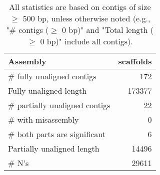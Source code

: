 \documentclass[12pt,a4paper]{article}
\begin{document}
\begin{table}[ht]
\begin{center}
\caption{All statistics are based on contigs of size $\geq$ 500 bp, unless otherwise noted (e.g., "\# contigs ($\geq$ 0 bp)" and "Total length ($\geq$ 0 bp)" include all contigs).}
\begin{tabular}{|l*{1}{|r}|}
\hline
Assembly & scaffolds \\ \hline
\# fully unaligned contigs & 172 \\ \hline
Fully unaligned length & 173377 \\ \hline
\# partially unaligned contigs & 22 \\ \hline
\hspace{5mm}\# with misassembly & 0 \\ \hline
\hspace{5mm}\# both parts are significant & 6 \\ \hline
Partially unaligned length & 14496 \\ \hline
\# N's & 29611 \\ \hline
\end{tabular}
\end{center}
\end{table}
\end{document}
